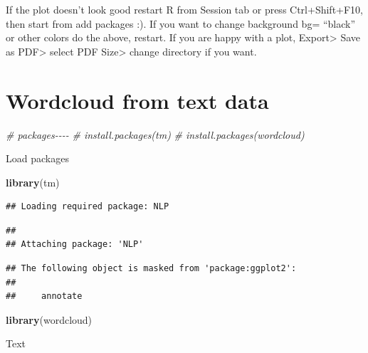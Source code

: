 \documentclass[
]{book}
\newenvironment{Shaded}{\begin{snugshade}}{\end{snugshade}}
\newcommand{\CommentTok}[1]{\textcolor[rgb]{0.56,0.35,0.01}{\textit{#1}}}
\newcommand{\FunctionTok}[1]{\textcolor[rgb]{0.13,0.29,0.53}{\textbf{#1}}}
\newcommand{\NormalTok}[1]{#1}
\begin{document}
If the plot doesn't look good restart R from Session tab or press Ctrl+Shift+F10, then start from add packages :). If you want to change background bg= ``black'' or other colors do the above, restart. If you are happy with a plot, Export\textgreater{} Save as PDF\textgreater{} select PDF Size\textgreater{} change directory if you want.

\hypertarget{wordcloud-from-text-data}{%
\section{Wordcloud from text data}\label{wordcloud-from-text-data}}

\begin{Shaded}
\begin{Highlighting}[]
\CommentTok{\# packages{-}{-}{-}{-}}
\CommentTok{\# install.packages(\textquotesingle{}tm\textquotesingle{})}
\CommentTok{\# install.packages(\textquotesingle{}wordcloud\textquotesingle{})}
\end{Highlighting}
\end{Shaded}

Load packages

\begin{Shaded}
\begin{Highlighting}[]
\FunctionTok{library}\NormalTok{(tm)}
\end{Highlighting}
\end{Shaded}

\begin{verbatim}
## Loading required package: NLP
\end{verbatim}

\begin{verbatim}
## 
## Attaching package: 'NLP'
\end{verbatim}

\begin{verbatim}
## The following object is masked from 'package:ggplot2':
## 
##     annotate
\end{verbatim}

\begin{Shaded}
\begin{Highlighting}[]
\FunctionTok{library}\NormalTok{(wordcloud)}
\end{Highlighting}
\end{Shaded}

Text
\end{document}

